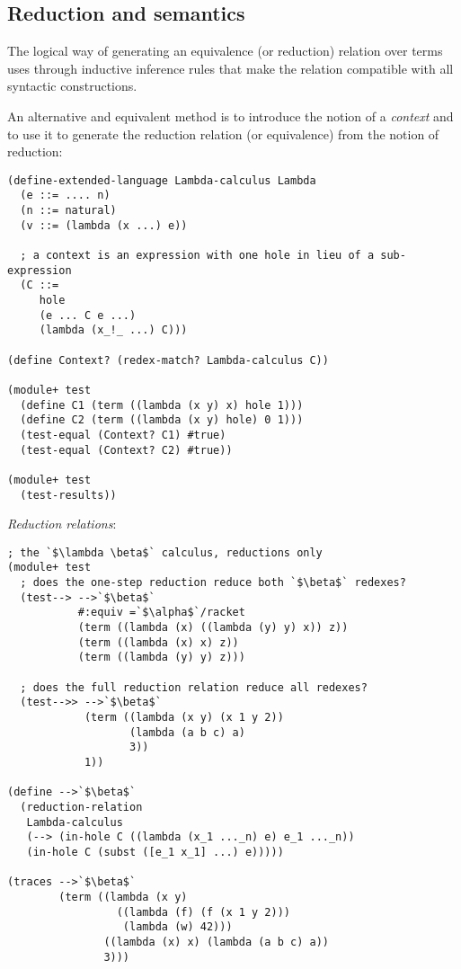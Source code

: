\subsection{Reduction and semantics}

The logical way of generating an equivalence (or reduction) relation over terms
uses through inductive inference rules that make the relation compatible with
all syntactic constructions.

An alternative and equivalent method is to introduce the notion of a
\textit{context} and to use it to generate the reduction relation (or
equivalence) from the notion of reduction:

\begin{lstlisting}[frame=none,numbers=none]
(define-extended-language Lambda-calculus Lambda
  (e ::= .... n)
  (n ::= natural)
  (v ::= (lambda (x ...) e))

  ; a context is an expression with one hole in lieu of a sub-expression
  (C ::=
     hole
     (e ... C e ...)
     (lambda (x_!_ ...) C)))

(define Context? (redex-match? Lambda-calculus C))

(module+ test
  (define C1 (term ((lambda (x y) x) hole 1)))
  (define C2 (term ((lambda (x y) hole) 0 1)))
  (test-equal (Context? C1) #true)
  (test-equal (Context? C2) #true))

(module+ test
  (test-results))
\end{lstlisting}

\textit{Reduction relations}:

\begin{lstlisting}[frame=none,numbers=none]
; the `$\lambda \beta$` calculus, reductions only
(module+ test
  ; does the one-step reduction reduce both `$\beta$` redexes?
  (test--> -->`$\beta$`
           #:equiv =`$\alpha$`/racket
           (term ((lambda (x) ((lambda (y) y) x)) z))
           (term ((lambda (x) x) z))
           (term ((lambda (y) y) z)))

  ; does the full reduction relation reduce all redexes?
  (test-->> -->`$\beta$`
            (term ((lambda (x y) (x 1 y 2))
                   (lambda (a b c) a)
                   3))
            1))

(define -->`$\beta$`
  (reduction-relation
   Lambda-calculus
   (--> (in-hole C ((lambda (x_1 ..._n) e) e_1 ..._n))
   (in-hole C (subst ([e_1 x_1] ...) e)))))

(traces -->`$\beta$`
        (term ((lambda (x y)
                 ((lambda (f) (f (x 1 y 2)))
                  (lambda (w) 42)))
               ((lambda (x) x) (lambda (a b c) a))
               3)))
\end{lstlisting}

